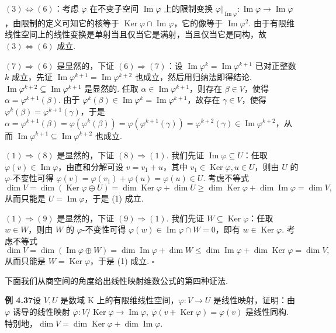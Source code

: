 \documentclass[UTF8, 12pt, fontset=fandol, oneside]{ctexart}
\begin{document}
$(3)\Leftrightarrow(6)$：考虑 $\varphi$ 在不变子空间 $\operatorname{Im}\varphi$ 上的限制变换 $\varphi|_{\operatorname{Im}\varphi}:\operatorname{Im}\varphi\to\operatorname{Im}\varphi$，由限制的定义可知它的核等于 $\operatorname{Ker}\varphi\cap\operatorname{Im}\varphi$，它的像等于 $\operatorname{Im}\varphi^2$. 由于有限维线性空间上的线性变换是单射当且仅当它是满射，当且仅当它是同构，故 $(3)\Leftrightarrow(6)$ 成立.

$(7)\Rightarrow(6)$ 是显然的，下证 $(6)\Rightarrow(7)$：设 $\operatorname{Im}\varphi^k=\operatorname{Im}\varphi^{k+1}$ 已对正整数 $k$ 成立，先证 $\operatorname{Im}\varphi^{k+1}=\operatorname{Im}\varphi^{k+2}$ 也成立，然后用归纳法即得结论. $\operatorname{Im}\varphi^{k+2}\subseteq\operatorname{Im}\varphi^{k+1}$ 是显然的. 任取 $\alpha\in\operatorname{Im}\varphi^{k+1}$，则存在 $\beta\in V$，使得 $\alpha=\varphi^{k+1}(\beta)$. 由于 $\varphi^k(\beta)\in\operatorname{Im}\varphi^k=\operatorname{Im}\varphi^{k+1}$，故存在 $\gamma\in V$，使得 $\varphi^k(\beta)=\varphi^{k+1}(\gamma)$，于是 $\alpha=\varphi^{k+1}(\beta)=\varphi(\varphi^k(\beta))=\varphi(\varphi^{k+1}(\gamma))=\varphi^{k+2}(\gamma)\in\operatorname{Im}\varphi^{k+2}$，从而 $\operatorname{Im}\varphi^{k+1}\subseteq\operatorname{Im}\varphi^{k+2}$ 也成立.

$(1)\Rightarrow(8)$ 是显然的，下证 $(8)\Rightarrow(1)$. 我们先证 $\operatorname{Im}\varphi\subseteq U$：任取 $\varphi(v)\in\operatorname{Im}\varphi$，由直和分解可设 $v=v_1+u$，其中 $v_1\in\operatorname{Ker}\varphi,u\in U$，则由 $U$ 的 $\varphi$-不变性可得 $\varphi(v)=\varphi(v_1)+\varphi(u)=\varphi(u)\in U$. 考虑不等式
\[
\dim V=\dim(\operatorname{Ker}\varphi\oplus U)=\dim\operatorname{Ker}\varphi+\dim U\ge \dim\operatorname{Ker}\varphi+\dim\operatorname{Im}\varphi=\dim V,
\]
从而只能是 $U=\operatorname{Im}\varphi$，于是 (1) 成立.

$(1)\Rightarrow(9)$ 是显然的，下证 $(9)\Rightarrow(1)$. 我们先证 $W\subseteq\operatorname{Ker}\varphi$：任取 $w\in W$，则由 $W$ 的 $\varphi$-不变性可得 $\varphi(w)\in\operatorname{Im}\varphi\cap W=0$，即有 $w\in\operatorname{Ker}\varphi$. 考虑不等式
\[
\dim V=\dim(\operatorname{Im}\varphi\oplus W)=\dim\operatorname{Im}\varphi+\dim W\le \dim\operatorname{Im}\varphi+\dim\operatorname{Ker}\varphi=\dim V,
\]
从而只能是 $W=\operatorname{Ker}\varphi$，于是 (1) 成立. $\square$

下面我们从商空间的角度给出线性映射维数公式的第四种证法.

\noindent\textbf{例 4.37}\quad 设 $V,U$ 是数域 $\mathrm{K}$ 上的有限维线性空间，$\varphi:V\to U$ 是线性映射，证明：由 $\varphi$ 诱导的线性映射 $\overline{\varphi}:V/\operatorname{Ker}\varphi\to\operatorname{Im}\varphi,\ \overline{\varphi}(v+\operatorname{Ker}\varphi)=\varphi(v)$ 是线性同构. 特别地，$\dim V=\dim\operatorname{Ker}\varphi+\dim\operatorname{Im}\varphi$.
\end{document}
